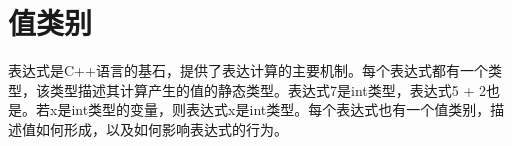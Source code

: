 \chapter{值类别}
表达式是C++语言的基石，提供了表达计算的主要机制。每个表达式都有一个类型，该类型描述其计算产生的值的静态类型。表达式7是int类型，表达式5 + 2也是。若x是int类型的变量，则表达式x是int类型。每个表达式也有一个值类别，描述值如何形成，以及如何影响表达式的行为。



